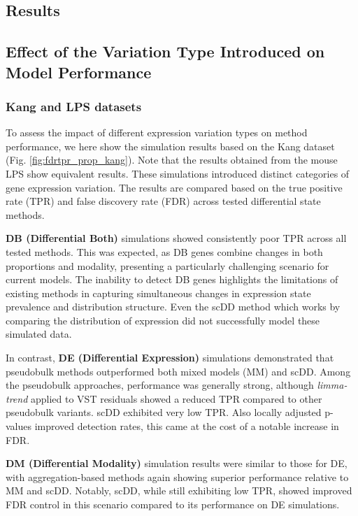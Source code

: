 \documentclass[a4paper, 11pt, twocolumn]{article}
\begin{document}
\begin{multicols}{2}
\section{Results}

\subsection{Effect of the Variation Type Introduced on Model Performance}

\subsubsection{Kang and LPS datasets}
To assess the impact of different expression variation types on method performance, we here show the simulation results based on the Kang dataset (Fig. \ref{fig:fdrtpr_prop_kang}). Note that the results obtained from the mouse LPS show equivalent results. These simulations introduced distinct categories of gene expression variation. The results are compared based on the true positive rate (TPR) and false discovery rate (FDR) across tested differential state methods.

\textbf{DB (Differential Both)} simulations showed consistently poor TPR across all tested methods. This was expected, as DB genes combine changes in both proportions and modality, presenting a particularly challenging scenario for current models. The inability to detect DB genes highlights the limitations of existing methods in capturing simultaneous changes in expression state prevalence and distribution structure. Even the scDD method which works by comparing the distribution of expression did not successfully model these simulated data.

In contrast, \textbf{DE (Differential Expression)} simulations demonstrated that pseudobulk methods outperformed both mixed models (MM) and scDD. Among the pseudobulk approaches, performance was generally strong, although \textit{limma-trend} applied to VST residuals showed a reduced TPR compared to other pseudobulk variants. scDD exhibited very low TPR. Also locally adjusted p-values improved detection rates, this came at the cost of a notable increase in FDR.

\textbf{DM (Differential Modality)} simulation results were similar to those for DE, with aggregation-based methods again showing superior performance relative to MM and scDD. Notably, scDD, while still exhibiting low TPR, showed improved FDR control in this scenario compared to its performance on DE simulations.


\end{multicols}
\end{document}
